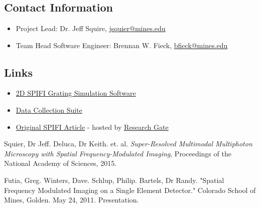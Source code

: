 \documentclass[12pt]{article}
\begin{document}
\section{\label{app:misc}}
\subsection{Contact Information}
\begin{itemize}
\item Project Lead: Dr. Jeff Squire, \href{mailto:jsquier@mines.edu}{jsquier@mines.edu}
\item Team Head Software Engineer: Brennan W. Fieck, \href{mailto:bfieck@mymail.mines.edu}{bfieck@mines.edu}
\end{itemize}
\subsection{Links}
\begin{itemize}
\item \href{https://gitlab.com/PiercingGaze/2DSimulator}{2D SPIFI Grating Simulation Software}
\item \href{https://gitlab.com/PiercingGaze/SPIFIDataCollectionSoftware}{Data Collection Suite}
\item \href{https://www.researchgate.net/profile/Alyssa_Allende_Motz/publication/281058706_Super-resolved_multimodal_multiphoton_microscopy_with_spatial_frequency-modulated_imaging/links/5790535d08ae64311c0c7dbb.pdf?origin=publication_detail&ev=pub_int_prw_xdl&msrp=c3fj9RD45iTpvk8bRBlzYkN6ndcAYlW9SDWsP0gVb8WzFV5pplCJ3WT6D9fQrP2OT3rGfRWxpWECBz07rTxtH3ZWQ-V2CIIn99KlfPF-otY.9HgCklW2b18-KeSg_Y6vX11zOug1uQ3SSCEpbGXSzk5y_fIuZAdBHJtjk82L1NpfpV2e2Cvcd6QBkqBT24bFzQ.uEqPWNYXdN8Ge_jgkDmRdTlNB8rMwiFPPFdueuZQ9VY6c_KOsp-YvgMVBaNkL6Ldag5ifDVuL2YqcNGnICTcHA}{Original SPIFI Article} - hosted by
\href{https://www.researchgate.net}{Research Gate}
\end{itemize}
\newpage
\begin{thebibliography}{9}

  Squier, Dr Jeff. Deluca, Dr Keith. et. al.
  \emph{Super-Resolved Multimodal Multiphoton Microscopy with Spatial Frequency-Modulated
Imaging},
  Proceedings of the National Academy of Sciences,
  2015.
  
  Futia, Greg. Winters, Dave. Schlup, Philip. Bartels, Dr Randy.
  "Spatial Frequency Modulated Imaging on a Single Element Detector."
  Colorado School of Mines, Golden. May 24, 2011. Presentation.
  

\end{thebibliography}
\end{document}

